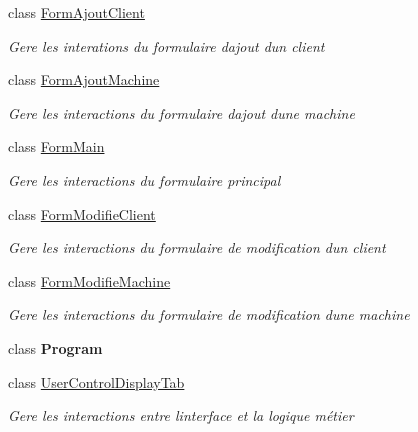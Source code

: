 \begin{DoxyCompactItemize}
\item 
class \mbox{\hyperlink{class_m_t_connect_agent_1_1_form_ajout_client}{Form\+Ajout\+Client}}
\begin{DoxyCompactList}\small\item\em Gere les interations du formulaire d\textquotesingle{}ajout d\textquotesingle{}un client \end{DoxyCompactList}\item 
class \mbox{\hyperlink{class_m_t_connect_agent_1_1_form_ajout_machine}{Form\+Ajout\+Machine}}
\begin{DoxyCompactList}\small\item\em Gere les interactions du formulaire d\textquotesingle{}ajout d\textquotesingle{}une machine \end{DoxyCompactList}\item 
class \mbox{\hyperlink{class_m_t_connect_agent_1_1_form_main}{Form\+Main}}
\begin{DoxyCompactList}\small\item\em Gere les interactions du formulaire principal \end{DoxyCompactList}\item 
class \mbox{\hyperlink{class_m_t_connect_agent_1_1_form_modifie_client}{Form\+Modifie\+Client}}
\begin{DoxyCompactList}\small\item\em Gere les interactions du formulaire de modification d\textquotesingle{}un client \end{DoxyCompactList}\item 
class \mbox{\hyperlink{class_m_t_connect_agent_1_1_form_modifie_machine}{Form\+Modifie\+Machine}}
\begin{DoxyCompactList}\small\item\em Gere les interactions du formulaire de modification d\textquotesingle{}une machine \end{DoxyCompactList}\item 
class {\bfseries Program}
\item 
class \mbox{\hyperlink{class_m_t_connect_agent_1_1_user_control_display_tab}{User\+Control\+Display\+Tab}}
\begin{DoxyCompactList}\small\item\em Gere les interactions entre l\textquotesingle{}interface et la logique métier \end{DoxyCompactList}\end{DoxyCompactItemize}
